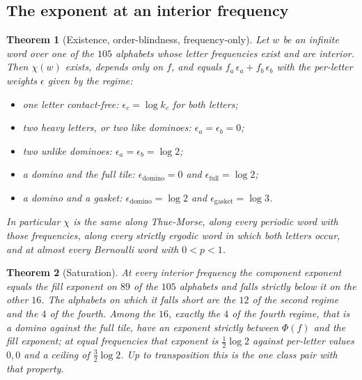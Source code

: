\documentclass[11pt]{amsart}
\newtheorem{theorem}{Theorem}[section]
\theoremstyle{definition}
\theoremstyle{remark}
\begin{document}
\subsection{The exponent at an interior frequency}

\begin{theorem}[Existence, order-blindness, frequency-only]
\label{thm:exponent}
Let $w$ be an infinite word over one of the $105$ alphabets whose letter frequencies exist and are interior. Then $\chi(w)$ exists, depends only on $f$, and equals $f_a \, \epsilon_a + f_b \, \epsilon_b$ with the per-letter weights $\epsilon$ given by the regime:
\begin{itemize}
\item one letter contact-free: $\epsilon_c = \log k_c$ for both letters;
\item two heavy letters, or two like dominoes: $\epsilon_a = \epsilon_b = 0$;
\item two unlike dominoes: $\epsilon_a = \epsilon_b = \log 2$;
\item a domino and the full tile: $\epsilon_{\text{domino}} = 0$ and $\epsilon_{\text{full}} = \log 2$;
\item a domino and a gasket: $\epsilon_{\text{domino}} = \log 2$ and $\epsilon_{\text{gasket}} = \log 3$.
\end{itemize}
In particular $\chi$ is the same along Thue-Morse, along every periodic word with those frequencies, along every strictly ergodic word in which both letters occur, and at almost every Bernoulli word with $0 < p < 1$.
\end{theorem}

\begin{theorem}[Saturation]
\label{thm:saturation}
At every interior frequency the component exponent equals the fill exponent on $89$ of the $105$ alphabets and falls strictly below it on the other $16$. The alphabets on which it falls short are the $12$ of the second regime and the $4$ of the fourth. Among the $16$, exactly the $4$ of the fourth regime, that is a domino against the full tile, have an exponent strictly between $\Phi(f)$ and the fill exponent; at equal frequencies that exponent is $\tfrac12 \log 2$ against per-letter values $0, 0$ and a ceiling of $\tfrac32\log 2$. Up to transposition this is the one class pair with that property.
\end{theorem}
\end{document}
